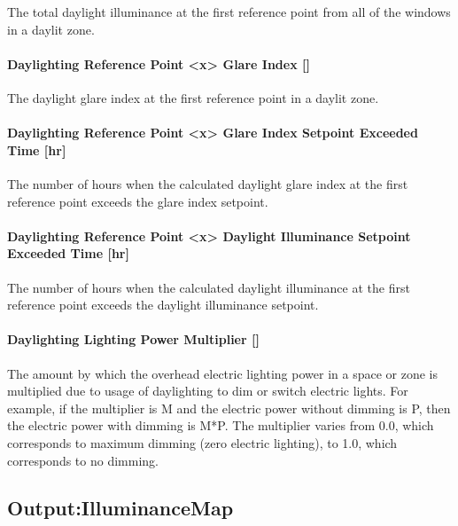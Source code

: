 The total daylight illuminance at the first reference point from all of the windows in a daylit zone.

\paragraph{Daylighting Reference Point <x> Glare Index {[]}}\label{daylighting-reference-point-1-glare-index}

The daylight glare index at the first reference point in a daylit zone.

\paragraph{Daylighting Reference Point <x> Glare Index Setpoint Exceeded Time {[}hr{]}}\label{daylighting-reference-point-1-glare-index-setpoint-exceeded-time-hr}

The number of hours when the calculated daylight glare index at the first reference point exceeds the glare index setpoint.

\paragraph{Daylighting Reference Point <x> Daylight Illuminance Setpoint Exceeded Time {[}hr{]}}\label{daylighting-reference-point-1-daylight-illuminance-setpoint-exceeded-time-hr}

The number of hours when the calculated daylight illuminance at the first reference point exceeds the daylight illuminance setpoint.

\paragraph{Daylighting Lighting Power Multiplier {[]}}\label{daylighting-lighting-power-multiplier-1}

The amount by which the overhead electric lighting power in a space or zone is multiplied due to usage of daylighting to dim or switch electric lights. For example, if the multiplier is M and the electric power without dimming is P, then the electric power with dimming is M*P. The multiplier varies from 0.0, which corresponds to maximum dimming (zero electric lighting), to 1.0, which corresponds to no dimming.

\subsection{Output:IlluminanceMap}\label{outputilluminancemap}

